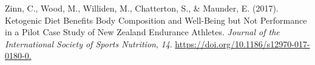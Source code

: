 \documentclass[]{cik}%
\newlength{\cslhangindent}
\newlength{\cslentryspacingunit} %
\newenvironment{CSLReferences}[2] %
 {%
  \setlength{\parindent}{0pt}
  \ifodd #1
  \let\oldpar\par
  \def\par{\hangindent=\cslhangindent\oldpar}
  \fi
  \setlength{\parskip}{#2\cslentryspacingunit}
 }%
 {}
\begin{document}
\begin{CSLReferences}{1}{0}
\leavevmode{}%
Zinn, C., Wood, M., Williden, M., Chatterton, S., \& Maunder, E. (2017).
Ketogenic Diet Benefits Body Composition and Well-Being but Not
Performance in a Pilot Case Study of New Zealand Endurance Athletes.
\emph{Journal of the International Society of Sports Nutrition},
\emph{14}. \url{https://doi.org/10.1186/s12970-017-0180-0.}

\end{CSLReferences}

%
%

%
%
%
%
\end{document}
